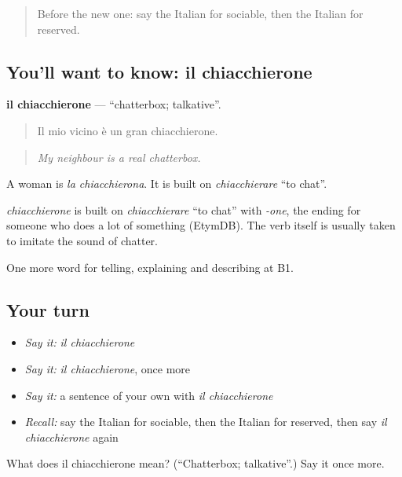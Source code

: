 \begin{quote}
Before the new one: say the Italian for sociable, then the Italian for reserved.
\end{quote}

\subsection*{You'll want to know: il chiacchierone}
\textbf{il chiacchierone} — \textquotedblleft{}chatterbox; talkative\textquotedblright{}.

\begin{quote}
Il mio vicino è un gran chiacchierone.
\end{quote}

\begin{quote}
\emph{My neighbour is a real chatterbox.}
\end{quote}

A woman is \emph{la chiacchierona}. It is built on \emph{chiacchierare} \textquotedblleft{}to chat\textquotedblright{}.

\begin{cousinweb}
\emph{chiacchierone} is built on \emph{chiacchierare} \textquotedblleft{}to chat\textquotedblright{} with \emph{-one}, the ending for someone who does a lot of something (EtymDB). The verb itself is usually taken to imitate the sound of chatter.
\end{cousinweb}

\begin{grammarlens}[title={What you've built}]
One more word for telling, explaining and describing at B1.
\end{grammarlens}

\subsection*{Your turn}
\begin{itemize}
\raggedright
  \item \emph{Say it:} \emph{il chiacchierone}
  \item \emph{Say it:} \emph{il chiacchierone}, once more
  \item \emph{Say it:} a sentence of your own with \emph{il chiacchierone}
  \item \emph{Recall:} say the Italian for sociable, then the Italian for reserved, then say \emph{il chiacchierone} again
\end{itemize}

\begin{tcolorbox}[breakable,colback=teal!4,colframe=teal!35!black,title={Before you move on}]
What does il chiacchierone mean? (\textquotedblleft{}Chatterbox; talkative\textquotedblright{}.) Say it once more.
\end{tcolorbox}
